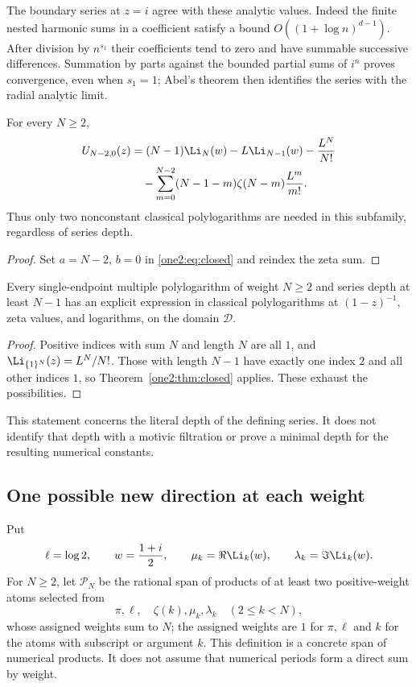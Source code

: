 The boundary series at $z=i$ agree with these analytic values.
Indeed the finite nested harmonic sums in a coefficient satisfy a
bound $O((1+\log n)^{d-1})$.  After division by $n^{s_1}$ their
coefficients tend to zero and have summable successive differences.
Summation by parts against the bounded partial sums of $i^n$ proves
convergence, even when $s_1=1$; Abel's theorem then identifies the
series with the radial analytic limit.

\begin{corollary}
\label{one2:cor:last}
For every $N\ge2$,
\begin{align}
 U_{N-2,0}(z)
 &=(N-1)\Li_N(w)-L\Li_{N-1}(w)-\frac{L^N}{N!}\notag\\
 &\quad-\sum_{m=0}^{N-2}(N-1-m)\zeta(N-m)\frac{L^m}{m!}.
 \label{one2:eq:last}
\end{align}
Thus only two nonconstant classical polylogarithms are needed in this
subfamily, regardless of series depth.
\end{corollary}
\begin{proof}
Set $a=N-2$, $b=0$ in \eqref{one2:eq:closed} and reindex the zeta sum.
\end{proof}

\begin{corollary}
\label{one2:cor:toplayers}
Every single-endpoint multiple polylogarithm of weight $N\ge2$ and
series depth at least $N-1$ has an explicit expression in classical
polylogarithms at $(1-z)^{-1}$, zeta values, and logarithms, on the
domain $\mathcal D$.
\end{corollary}
\begin{proof}
Positive indices with sum $N$ and length $N$ are all $1$, and
$\Li_{\{1\}^N}(z)=L^N/N!$. Those with length $N-1$ have exactly one
index $2$ and all other indices $1$, so Theorem~\ref{one2:thm:closed}
applies. These exhaust the possibilities.
\end{proof}

This statement concerns the literal depth of the defining series.
It does not identify that depth with a motivic filtration or prove a
minimal depth for the resulting numerical constants.

\subsection{One possible new direction at each weight}

Put
\[
 \ell=\log2,\qquad w=\frac{1+i}{2},\qquad
 \mu_k=\Re\Li_k(w),\qquad\lambda_k=\Im\Li_k(w).
\]
For $N\ge2$, let $\mathscr P_N$ be the rational span of products of
at least two positive-weight atoms selected from
\[
 \pi,\ell,\quad \zeta(k),\mu_k,\lambda_k\quad(2\le k<N),
\]
whose assigned weights sum to $N$; the assigned weights are $1$ for
$\pi,\ell$ and $k$ for the atoms with subscript or argument $k$.
This definition is a concrete span of numerical products.  It does
not assume that numerical periods form a direct sum by weight.

